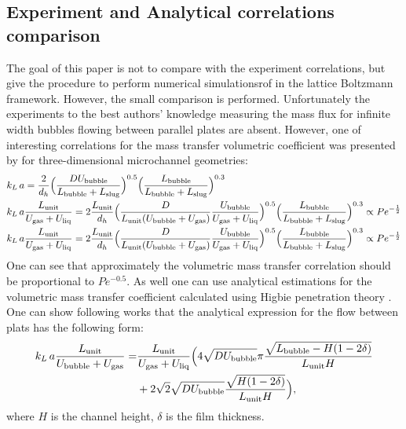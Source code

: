 \documentclass{article}
\newcommand{\beq}{\begin{equation}}
\newcommand{\feq}{\end{equation}}
\newcommand{\beqal}{\begin{equation}\begin{aligned}}
\newcommand{\feqal}{\end{aligned}\end{equation}}
\newcommand{\vol}{k_L\,a}
\newcommand{\lbubble}{L_{\mathrm{bubble}}}
\newcommand{\lunit}{L_{\mathrm{unit}}}
\newcommand{\lslug}{L_{\mathrm{slug}}}
\newcommand{\ububble}{U_{\mathrm{bubble}}}
\newcommand{\uliq}{U_{\mathrm{liq}}}
\newcommand{\ugas}{U_{\mathrm{gas}}}
\newcommand{\volnondim}{\vol \frac{\lunit}{\ububble+\ugas}}
\begin{document}
\subsection{Experiment and Analytical correlations comparison}
The goal of this paper is not to compare with the experiment correlations, but give the
procedure to perform numerical simulationsrof  in the lattice Boltzmann framework. However, the
small comparison is performed.
Unfortunately the experiments to the best authors' knowledge measuring the mass flux for infinite
width  bubbles flowing between parallel plates are absent. However, one of interesting
correlations for the mass transfer volumetric coefficient was presented by
\citet{yue-mass} for three-dimensional microchannel geometries:
\beqal
&\vol=\frac{2}{d_h}\Bigl(\frac{D \ububble}{\lbubble+\lslug}\Bigr)^{0.5}
\Bigl(\frac{\lbubble}{\lbubble+\lslug}\Bigr)^{0.3}\\
&\vol \frac{\lunit}{\ugas+\uliq}=2\frac{\lunit}{d_h} \Bigl(\frac{D 
}{\lunit (\ububble+\ugas)} \frac{\ububble}{\ugas+\uliq}\Bigr)^{0.5}
\Bigl(\frac{\lbubble}{\lbubble+\lslug}\Bigr)^{0.3} \propto Pe^{-\frac{1}{2}}\\
&\vol \frac{\lunit}{\ugas+\uliq}=2\frac{\lunit}{d_h} \Bigl(\frac{D 
}{\lunit (\ububble+\ugas)} \frac{\ububble}{\ugas+\uliq}\Bigr)^{0.5}
\Bigl(\frac{\lbubble}{\lbubble+\lslug}\Bigr)^{0.3} \propto Pe^{-\frac{1}{2}}
\feqal
One can see that approximately the volumetric mass transfer correlation should be proportional to
$Pe^{-0.5}$. As well one can use analytical estimations for the volumetric mass transfer
coefficient calculated using Higbie penetration theory \cite{higbie}. One can show following works
\cite{irandoust,vanbaten-circular} that the analytical expression for the flow between plats has
the following form:
\beq
\label{vanbaten:analytical:expresssion}
\begin{aligned}
\volnondim=&\frac{\lunit}{\ugas+\uliq}\Bigl(4 \sqrt{D \ububble}{\pi}
\frac{\sqrt{\lbubble-H (1-2\delta)}}{\lunit H}\\
&+2 \sqrt{2} \sqrt{D \ububble} \frac{\sqrt{H
(1-2\delta)}}{\lunit H}\Bigr),
\end{aligned}
\feq
where $H$ is the channel height, $\delta$ is the film thickness.
\end{document}
